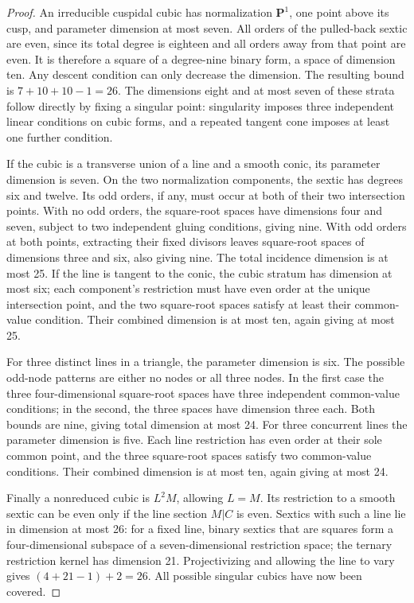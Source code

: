 \begin{proof}
An irreducible cuspidal cubic has normalization $\mathbf P^1$, one
point above its cusp, and parameter dimension at most seven.  All
orders of the pulled-back sextic are even, since its total degree is
eighteen and all orders away from that point are even.  It is therefore
a square of a degree-nine binary form, a space of dimension ten.
Any descent condition can only decrease the dimension.  The resulting
bound is $7+10+10-1=26$.  The dimensions eight and at most seven of
these strata follow directly by fixing a singular point: singularity
imposes three independent linear conditions on cubic forms, and a
repeated tangent cone imposes at least one further condition.

If the cubic is a transverse union of a line and a smooth conic, its
parameter dimension is seven.  On the two normalization components,
the sextic has degrees six and twelve.  Its odd orders, if any, must
occur at both of their two intersection points.  With no odd orders,
the square-root spaces have dimensions four and seven, subject to
two independent gluing conditions, giving nine.  With odd orders at
both points, extracting their fixed divisors leaves square-root
spaces of dimensions three and six, also giving nine.  The total
incidence dimension is at most 25.  If the line is tangent to the
conic, the cubic stratum has dimension at most six; each component's
restriction must have even order at the unique intersection point,
and the two square-root spaces satisfy at least their common-value
condition.  Their combined dimension is at most ten, again giving
at most 25.

For three distinct lines in a triangle, the parameter dimension is
six.  The possible odd-node patterns are either no nodes or all three
nodes.  In the first case the three four-dimensional square-root
spaces have three independent common-value conditions; in the second,
the three spaces have dimension three each.  Both bounds are nine,
giving total dimension at most 24.  For three concurrent lines the
parameter dimension is five.  Each line restriction has even order
at their sole common point, and the three square-root spaces satisfy
two common-value conditions.  Their combined dimension is at most
ten, again giving at most 24.

Finally a nonreduced cubic is $L^2M$, allowing $L=M$.
Its restriction to a smooth sextic can be even only if the line
section $M|C$ is even.  Sextics with such a line lie in dimension at
most 26: for a fixed line, binary sextics that are squares form a
four-dimensional subspace of a seven-dimensional restriction space;
the ternary restriction kernel has dimension 21.  Projectivizing and
allowing the line to vary gives $(4+21-1)+2=26$.
All possible singular cubics have now been covered.


\end{proof}
